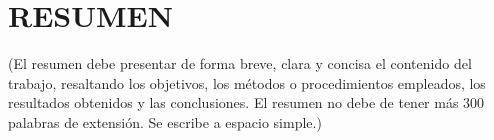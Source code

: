 \chapter*{RESUMEN}

(El resumen debe presentar de forma breve, clara y concisa el contenido del trabajo, resaltando los objetivos, los métodos o procedimientos empleados, los resultados obtenidos y las conclusiones. El resumen no debe de tener más 300 palabras de extensión. Se escribe a espacio simple.)

\clearpage